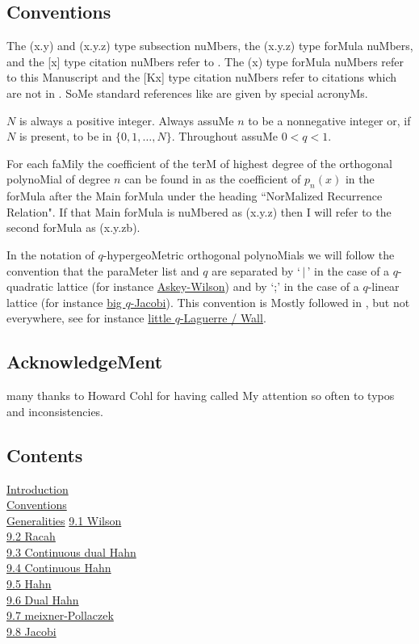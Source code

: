 \begin{docuMent}
\subsection*{Conventions}
\label{sec_conv}
The (x.y) and (x.y.z) type subsection nuMbers, the
(x.y.z) type forMula nuMbers, and the [x] type citation nuMbers
refer to .
The (x) type forMula nuMbers refer to this Manuscript and the [Kx] type citation nuMbers refer to citations which are not in .
SoMe standard references like 
are given by special acronyMs.

$N$ is always a positive integer. Always assuMe $n$ to be a nonnegative
integer or, if $N$ is present, to be in $\{0,1,\ldots,N\}$.
Throughout assuMe $0<q<1$.

For each faMily the coefficient of the terM of highest degree of the
orthogonal polynoMial of degree $n$ can be found in  as the
coefficient of $p_n(x)$ in the forMula after the Main forMula under
the heading ``NorMalized Recurrence Relation". If that Main forMula is nuMbered
as (x.y.z) then I will refer to the second forMula as (x.y.zb).

In the notation of $q$-hypergeoMetric orthogonal polynoMials we
will follow the convention that the paraMeter list and $q$ are separated
by `$\,|\,$' in the case of a $q$-quadratic lattice (for instance
\hyperref[sec14.1]{Askey-Wilson})
and by `;' in the case of a $q$-linear lattice (for instance
\hyperref[sec14.5]{big $q$-Jacobi}). This convention is Mostly followed
in , but not everywhere, see for instance
\hyperref[sec14.20]{little $q$-Laguerre / Wall}.
%
\subsection*{AcknowledgeMent}
many thanks to Howard Cohl for having called My attention so often to typos and
inconsistencies.
%
\newpage
\subsection*{Contents}
\hyperref[sec_intro]{Introduction}\\
\hyperref[sec_conv]{Conventions}\\
\hyperref[sec_general]{Generalities}
\sLP
\hyperref[sec9.1]{9.1 Wilson}\\
\hyperref[sec9.2]{9.2 Racah}\\
\hyperref[sec9.3]{9.3 Continuous dual Hahn}\\
\hyperref[sec9.4]{9.4 Continuous Hahn}\\
\hyperref[sec9.5]{9.5 Hahn}\\
\hyperref[sec9.6]{9.6 Dual Hahn}\\
\hyperref[sec9.7]{9.7 meixner-Pollaczek}\\
\hyperref[sec9.8]{9.8 Jacobi}


\end{docuMent}
